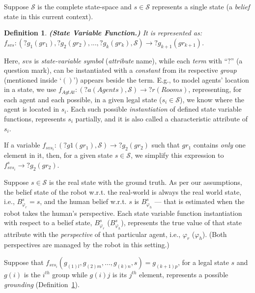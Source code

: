 \documentclass[letterpaper]{article} %
\newtheorem{definition}{Definition}
\begin{document}
Suppose $\mathcal{S}$ is the complete state-space and $s \in \mathcal{S}$ represents a single state (a \textit{belief} state in this current context).  

\begin{definition}\label{def:svf}
\textbf{(State Variable Function.)} It is represented as: $f_{svs}:(?g_1 (gr_1), ?g_2 (gr_2), ..., ?g_k (gr_k),\mathcal{S})\rightarrow ?g_{k+1} (gr_{k+1})$. 
\end{definition}
Here, $svs$ is \textit{state-variable symbol} (\textit{attribute} name), while each \textit{term} with ``$?$'' (a question mark), can be instantiated with a \textit{constant} from its respective \textit{group} (mentioned inside `$()$') appears beside the term. 
E.g., to model agents' location in a state, we use $f_{\textit{AgtAt}}:(?a (Agents), \mathcal{S}) \rightarrow ?r (Rooms)$, representing, for each agent and each possible, in a given legal state ($s_i \in \mathcal{S}$), we know where the agent is located in $s_i$. 
Each such possible \textit{instantiation} of defined state variable functions, represents $s_i$ partially, and it is also called a characteristic attribute of $s_i$.     

If a variable $f_{svs_i}: (?g1 (gr_1), \mathcal{S}) \rightarrow ?g_2 (gr_2)$ such that $gr_1$ contains \textit{only} one element in it, then, for a given state $s \in \mathcal{S}$, we simplify this expression to $f_{svs_i}^{s} \rightarrow ?g_2 (gr_2)$. 

Suppose $s \in \mathcal{S}$ is the real state with the ground truth. As per our assumptions, the belief state of the robot w.r.t. the real-world is always the real world state, i.e., $B_{\varphi_r}^s = s$, and the human belief w.r.t. $s$ is $B_{\varphi_h}^s$ --- that is estimated when the robot takes the human's perspective. Each state variable function instantiation with respect to a belief state, $B_{\varphi_r}^s$ ($B_{\varphi_h}^s$), represents the true value of that state attribute with the \textit{perspective} of that particular agent, i.e., $\varphi_r$ ($\varphi_h$). (Both perspectives are managed by the robot in this setting.) 

Suppose that 
$f_{\textit{svs}_i}(g_{(1)l},g_{(2)m},...,g_{(k)n},s) = g_{(k+1)p}$, for a legal state $s$ and $g(i)$ is the $i^{th}$ group while $g(i)j$ is its $j^{th}$ element, represents a possible {\em grounding} (Definition~\ref{def:svf}).
\end{document}

